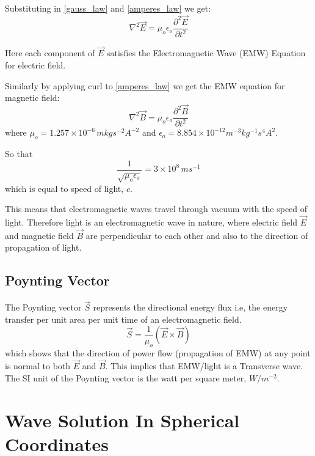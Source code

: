Substituting in \eqref{gauss_law} and \eqref{amperes_law} we get:
%
   \begin{equation}
   \nabla^2\vec{E} =  \mu_{o}\epsilon_{o}\frac{\partial^2\vec{E}}{\partial t^2}
   \end{equation}

Here each component of $\vec{E}$ satisfies the Electromagnetic Wave (EMW) Equation for electric field.

Similarly by applying curl to \eqref{amperes_law} we get the EMW equation for magnetic field:
%
   \begin{equation}
   \nabla^2\vec{B} =  \mu_{o}\epsilon_{o}\frac{\partial^2\vec{B}}{\partial t^2}
   \end{equation}
%
where $\mu_{o} = 1.257\times10^{-6} \, m kg s^{-2} A^{-2}$ and $\epsilon_{o} = 8.854 \times 10^{-12} m^{-3} kg^{-1} s^4 A^2$.

So that
%
   \begin{equation}
   \frac{1}{\sqrt{\mu_{o}\epsilon_{o}}} = 3\times10^8 \, ms^{-1}
   \end{equation}
%
which is equal to speed of light, $c$.

This means that electromagnetic waves travel through vacuum with the speed of light. Therefore light is an electromagnetic wave in nature, where electric field $\vec{E}$ and magnetic field $\vec{B}$ are perpendicular to each other and also to the direction of propagation of light.


\subsection{Poynting Vector}

The Poynting vector $\vec{S}$ represents the directional energy flux i.e, the energy transfer per unit area per unit time of an electromagnetic field.
%
   \begin{equation}
   \vec{S} = \frac{1}{\mu_{o}}(\vec{E}\times\vec{B})
   \end{equation}
%
which shows that the direction of power flow (propagation of EMW) at any point is normal to both $\vec{E}$ and $\vec{B}$. This implies that EMW/light is a Transverse wave. The SI unit of the Poynting vector is the watt per square meter, $W/m^{-2}$.


\section{Wave Solution In Spherical Coordinates}


